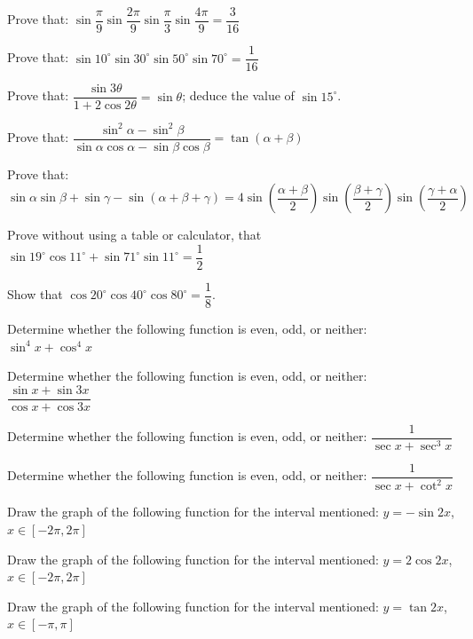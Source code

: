 \documentclass[11pt,a4paper]{article}
\begin{document}
\begin{longlist}
\item Prove that: $\sin\dfrac{\pi}{9}\sin\dfrac{2\pi}{9}\sin\dfrac{\pi}{3}\sin\dfrac{4\pi}{9}=\dfrac{3}{16}$

\item Prove that: $\sin10^\circ\sin30^\circ\sin50^\circ\sin70^\circ=\dfrac{1}{16}$

\item Prove that: $\dfrac{\sin3\theta}{1+2\cos2\theta}=\sin\theta$; deduce the value of $\sin15^\circ$.

\item Prove that: $\dfrac{\sin^2\alpha-\sin^2\beta}{\sin\alpha\cos\alpha-\sin\beta\cos\beta}=\tan(\alpha+\beta)$

\item Prove that: $\sin\alpha\sin\beta+\sin\gamma-\sin(\alpha+\beta+\gamma)=4\sin\left(\dfrac{\alpha+\beta}{2}\right)\sin\left(\dfrac{\beta+\gamma}{2}\right)\sin\left(\dfrac{\gamma+\alpha}{2}\right)$

\item Prove without using a table or calculator, that $\sin19^\circ\cos11^\circ+\sin71^\circ\sin11^\circ=\dfrac{1}{2}$

\item Show that $\cos20^\circ\cos40^\circ\cos80^\circ=\dfrac{1}{8}$.

\item Determine whether the following function is even, odd, or neither: $\sin^4x+\cos^4x$

\item Determine whether the following function is even, odd, or neither: $\dfrac{\sin x+\sin3x}{\cos x+\cos3x}$

\item Determine whether the following function is even, odd, or neither: $\dfrac{1}{\sec x+\sec^3x}$

\item Determine whether the following function is even, odd, or neither: $\dfrac{1}{\sec x+\cot^2x}$

\item Draw the graph of the following function for the interval mentioned: $y=-\sin2x$, $x\in[-2\pi,2\pi]$

\item Draw the graph of the following function for the interval mentioned: $y=2\cos2x$, $x\in[-2\pi,2\pi]$

\item Draw the graph of the following function for the interval mentioned: $y=\tan2x$, $x\in[-\pi,\pi]$


\end{longlist}
\end{document}
